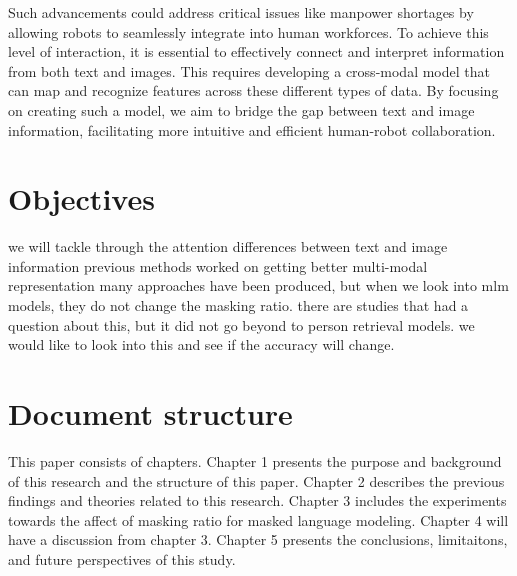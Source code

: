 Such advancements could address critical issues like manpower shortages by allowing robots to seamlessly integrate into human workforces. To achieve this level of interaction, it is essential to effectively connect and interpret information from both text and images. This requires developing a cross-modal model that can map and recognize features across these different types of data. By focusing on creating such a model, we aim to bridge the gap between text and image information, facilitating more intuitive and efficient human-robot collaboration.

\section{Objectives}
we will tackle through the attention differences between text and image information
previous methods worked on getting better multi-modal representation 
many approaches have been produced, but when we look into mlm models, they do not change the masking ratio. there are studies that had a question about this, but it did not go beyond to person retrieval models. we would like to look into this and see if the accuracy will change.

\section{Document structure}

This paper consists of chapters. Chapter 1 presents the purpose and background of this research and the structure of this paper. Chapter 2 describes the previous findings and theories related to this research. Chapter 3 includes the experiments towards the affect of masking ratio for masked language modeling. Chapter 4 will have a discussion from chapter 3. Chapter 5 presents the conclusions, limitaitons, and future perspectives of this study.
